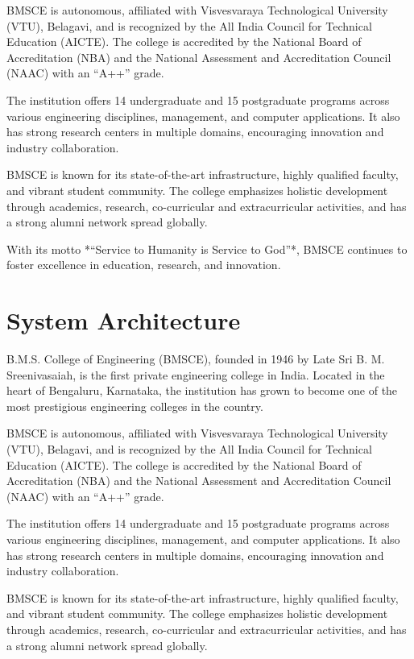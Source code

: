 \documentclass[12pt,a4paper]{report}
\begin{document}
BMSCE is autonomous, affiliated with Visvesvaraya Technological University (VTU), Belagavi, 
and is recognized by the All India Council for Technical Education (AICTE). The college is 
accredited by the National Board of Accreditation (NBA) and the National Assessment and 
Accreditation Council (NAAC) with an “A++” grade.

The institution offers 14 undergraduate and 15 postgraduate programs across various 
engineering disciplines, management, and computer applications. It also has strong research 
centers in multiple domains, encouraging innovation and industry collaboration. 

BMSCE is known for its state-of-the-art infrastructure, highly qualified faculty, and vibrant 
student community. The college emphasizes holistic development through academics, research, 
co-curricular and extracurricular activities, and has a strong alumni network spread 
globally. 

With its motto *“Service to Humanity is Service to God”*, BMSCE continues to foster 
excellence in education, research, and innovation.
\section{ System Architecture }
B.M.S. College of Engineering (BMSCE), founded in 1946 by Late Sri B. M. Sreenivasaiah, 
is the first private engineering college in India. Located in the heart of Bengaluru, 
Karnataka, the institution has grown to become one of the most prestigious engineering 
colleges in the country. 

BMSCE is autonomous, affiliated with Visvesvaraya Technological University (VTU), Belagavi, 
and is recognized by the All India Council for Technical Education (AICTE). The college is 
accredited by the National Board of Accreditation (NBA) and the National Assessment and 
Accreditation Council (NAAC) with an “A++” grade.

The institution offers 14 undergraduate and 15 postgraduate programs across various 
engineering disciplines, management, and computer applications. It also has strong research 
centers in multiple domains, encouraging innovation and industry collaboration. 

BMSCE is known for its state-of-the-art infrastructure, highly qualified faculty, and vibrant 
student community. The college emphasizes holistic development through academics, research, 
co-curricular and extracurricular activities, and has a strong alumni network spread 
globally. 
\end{document}
